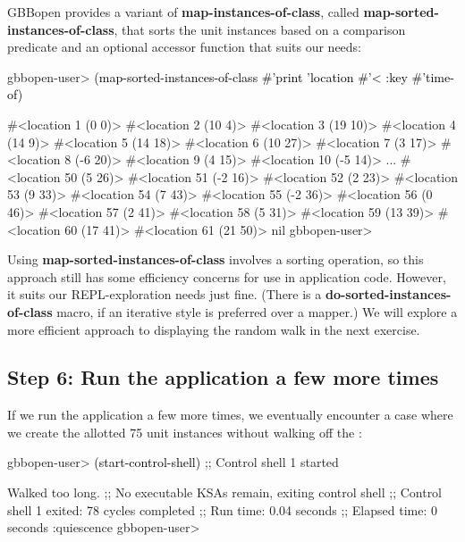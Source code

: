 \documentclass[10pt,twoside,english,pdftex]{article}
\begin{document}
%
%
GBBopen provides a variant of \textbf{map-instances-of-class}, called
\textbf{map-sorted-instances-of-class}, that sorts the unit instances based on
a comparison predicate and an optional  accessor function that
suits our needs:
%
\W\supp
\begin{example}
\textcolor{darkergray}{%
  gbbopen-user> \textcolor{black}{(map-sorted-instances-of-class #'print 'location #'< 
                   :key #'time-of)}

  #<location 1 (0 0)> 
  #<location 2 (10 4)> 
  #<location 3 (19 10)> 
  #<location 4 (14 9)> 
  #<location 5 (14 18)> 
  #<location 6 (10 27)> 
  #<location 7 (3 17)> 
  #<location 8 (-6 20)> 
  #<location 9 (4 15)> 
  #<location 10 (-5 14)> 
       ...
  #<location 50 (5 26)> 
  #<location 51 (-2 16)> 
  #<location 52 (2 23)> 
  #<location 53 (9 33)> 
  #<location 54 (7 43)> 
  #<location 55 (-2 36)> 
  #<location 56 (0 46)> 
  #<location 57 (2 41)> 
  #<location 58 (5 31)> 
  #<location 59 (13 39)> 
  #<location 60 (17 41)> 
  #<location 61 (21 50)> 
  nil
  gbbopen-user>}
\end{example}

%
%
Using \textbf{map-sorted-instances-of-class} involves a sorting operation, so
this approach still has some efficiency concerns for use in application code.
However, it suits our REPL-exploration needs just fine.  (There is a
\textbf{do-sorted-instances-of-class} macro, if an iterative style is
preferred over a mapper.)  We will explore a more efficient approach to
displaying the random walk in the next exercise.

\subsection*{Step 6:  Run the application a few more times}

%
%
If we run the application a few more times, we eventually encounter a case
where we create the allotted 75  unit instances without walking
off the :
%
\W\supp
\begin{example}
\textcolor{darkergray}{%
  gbbopen-user> \textcolor{black}{(start-control-shell)}
  ;; Control shell 1 started

  Walked too long.
  ;; No executable KSAs remain, exiting control shell
  ;; Control shell 1 exited: 78 cycles completed
  ;; Run time: 0.04 seconds
  ;; Elapsed time: 0 seconds
  :quiescence
  gbbopen-user>}
\end{example}
\end{document}
